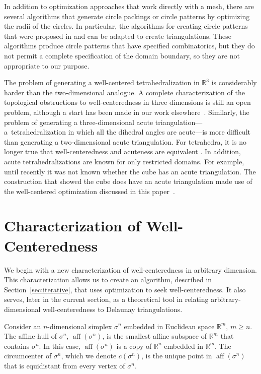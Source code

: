 \documentclass[final]{siamltex}
\newcommand{\Real}{\ensuremath{\mathbb{R}}} \newcommand{\meshM}{\ensuremath{\mathcal{M}}} \newcommand{\meshV}{\ensuremath{\mathcal{V}}} \newcommand{\meshT}{\ensuremath{\mathcal{T}}} \newcommand{\interior}{\ensuremath{\mathrm{Int}}}
\DeclareMathOperator{\aff}{aff}
\begin{document}
In addition to optimization approaches that work directly with a mesh,
there are several algorithms that generate circle packings or circle
patterns by optimizing the radii of the circles.  In particular, the
algorithms for creating circle patterns that were proposed in
\cite{CoSt2003} and \cite{BoSp2004} can be adapted to create
triangulations.  These algorithms produce circle patterns that have
specified combinatorics, but they do not permit a complete
specification of the domain boundary, so they are not appropriate to
our purpose.

The problem of generating a well-centered tetrahedralization in
$\Real^{3}$ is considerably harder than the two-dimensional
analogue. A complete characterization of the topological obstructions
to well-centeredness in three dimensions is still an open problem,
although a start has been made in our work
elsewhere~\cite{VaHiGuRaZh2008}. Similarly, the problem of generating
a three-dimensional acute triangulation---a~tetrahedralization in
which all the dihedral angles are acute---is more difficult than
generating a two-dimensional acute triangulation. For tetrahedra, it
is no longer true that well-centeredness and acuteness are equivalent
\cite[Section 2]{VaHiGu2008}.
In addition, acute tetrahedralizations
are known for only restricted domains.  For example,
until recently it was not
known whether the cube has an acute triangulation.  The
construction that showed the cube does have an acute
triangulation made use of the well-centered optimization
discussed in this paper~\cite{VaHiZhGu2009}.
 

\section{Characterization of Well-Centeredness}

We begin with a new characterization of well-centeredness in arbitrary
dimension. This characterization allows us to create 
an algorithm, described in Section~\ref{sec:iterative},
that uses optimization to seek well-centeredness.
It also serves, later in the current
section, as a theoretical tool in relating arbitrary-dimensional
well-centeredness to Delaunay triangulations.

Consider an $n$-dimensional simplex $\sigma^{n}$ embedded in Euclidean
space $\Real^{m}$, $m \ge n$.  The affine hull of $\sigma^{n}$,
$\aff(\sigma^{n})$, is the smallest affine subspace of $\Real^{m}$
that contains $\sigma^{n}$.  In this case, $\aff(\sigma^{n})$ is a
copy of $\Real^{n}$ embedded in $\Real^{m}$.  The circumcenter of
$\sigma^{n}$, which we denote $c(\sigma^{n})$, is the unique point in
$\aff(\sigma^{n})$ that is equidistant from every vertex of
$\sigma^{n}$.
\end{document}
